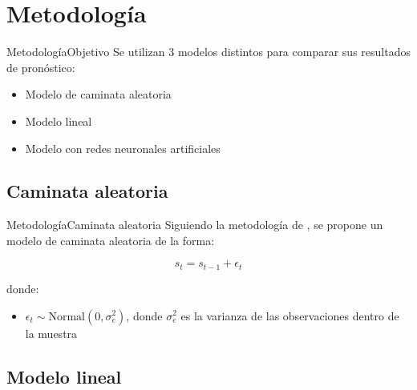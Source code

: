 \documentclass{beamer}
\begin{document}
\section{Metodología}

\begin{frame}{Metodología}{Objetivo}
	Se utilizan 3 modelos distintos para comparar sus resultados de pronóstico:
	\begin{itemize}
		\item Modelo de caminata aleatoria
		\item Modelo lineal
		\item Modelo con redes neuronales artificiales
	\end{itemize}
\end{frame}

\subsection{Caminata aleatoria}

\begin{frame}{Metodología}{Caminata aleatoria}
	Siguiendo la metodología de \textcite{meese1983empirical}, se propone un modelo de caminata aleatoria de la forma: 
	
	\begin{equation}
	s_t = s_{t-1} + \epsilon_t
	\end{equation}
	
	donde:
	\begin{itemize}
		\item $\epsilon_t \sim \mathrm{Normal}(0, \sigma_e^2)$, donde $\sigma_e^2$ es la varianza de las observaciones dentro de la muestra
	\end{itemize}
\end{frame}

\subsection{Modelo lineal}
\end{document}
